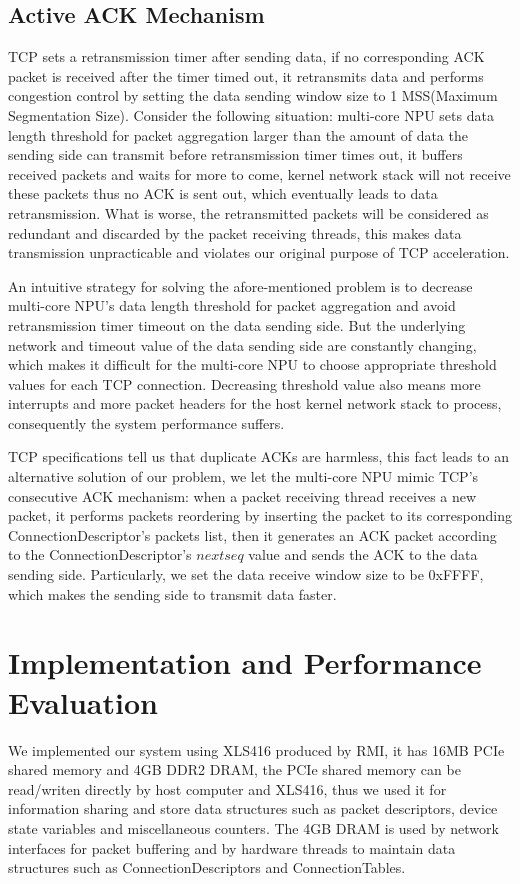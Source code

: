 \documentclass[conference]{IEEEtran}
\begin{document}
\subsection{Active ACK Mechanism}
TCP sets a retransmission timer after sending data, if no corresponding ACK packet is received after the timer timed out, it retransmits data and performs congestion control by setting the data sending window size to 1 MSS(Maximum Segmentation Size). Consider the following situation: multi-core NPU sets data length threshold for packet aggregation larger than the amount of data the sending side can transmit before retransmission timer times out, it buffers received packets and waits for more to come, kernel network stack will not receive these packets thus no ACK is sent out, which eventually leads to data retransmission. What is worse, the retransmitted packets will be considered as redundant and discarded by the packet receiving threads, this makes data transmission unpracticable and violates our original purpose of TCP acceleration.

 An intuitive strategy for solving the afore-mentioned problem is to decrease multi-core NPU's data length threshold for packet aggregation and avoid retransmission timer timeout on the data sending side. But the underlying network and timeout value of the data sending side are constantly changing, which makes it difficult for the multi-core NPU to choose appropriate threshold values for each TCP connection. Decreasing threshold value also means more interrupts and more packet headers for the host kernel network stack to process, consequently the system performance suffers.

 TCP specifications tell us that duplicate ACKs are harmless, this fact leads to an alternative solution of our problem, we let the multi-core NPU mimic TCP's consecutive ACK mechanism: when a packet receiving thread receives a new packet, it performs packets reordering by inserting the packet to its corresponding ConnectionDescriptor's packets list, then it generates an ACK packet according to the ConnectionDescriptor's $nextseq$ value and sends the ACK to the data sending side. Particularly, we set the data receive window size to be 0xFFFF, which makes the sending side to transmit data faster.
\section{Implementation and Performance Evaluation}
We implemented our system using XLS416 produced by RMI, it has 16MB PCIe shared memory and 4GB DDR2 DRAM, the PCIe shared memory can be read/writen directly by host computer and XLS416, thus we used it for information sharing and store data structures such as packet descriptors, device state variables and miscellaneous counters. The 4GB DRAM is used by network interfaces for packet buffering and by hardware threads to maintain data structures such as ConnectionDescriptors and ConnectionTables.
\end{document}
